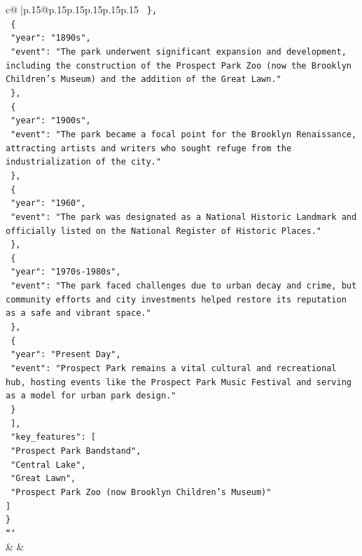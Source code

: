 \documentclass{article}
\begin{document}
{\begin{supertabular}{c@{$\;$}|p{.15\linewidth}@{}p{.15\linewidth}p{.15\linewidth}p{.15\linewidth}p{.15\linewidth}p{.15\linewidth}}
{{{\texttt{    \},} \\
\texttt{    \{} \\
\texttt{      "year": "1890s",} \\
\texttt{      "event": "The park underwent significant expansion and development, including the construction of the Prospect Park Zoo (now the Brooklyn Children's Museum) and the addition of the Great Lawn."} \\
\texttt{    \},} \\
\texttt{    \{} \\
\texttt{      "year": "1900s",} \\
\texttt{      "event": "The park became a focal point for the Brooklyn Renaissance, attracting artists and writers who sought refuge from the industrialization of the city."} \\
\texttt{    \},} \\
\texttt{    \{} \\
\texttt{      "year": "1960",} \\
\texttt{      "event": "The park was designated as a National Historic Landmark and officially listed on the National Register of Historic Places."} \\
\texttt{    \},} \\
\texttt{    \{} \\
\texttt{      "year": "1970s{-}1980s",} \\
\texttt{      "event": "The park faced challenges due to urban decay and crime, but community efforts and city investments helped restore its reputation as a safe and vibrant space."} \\
\texttt{    \},} \\
\texttt{    \{} \\
\texttt{      "year": "Present Day",} \\
\texttt{      "event": "Prospect Park remains a vital cultural and recreational hub, hosting events like the Prospect Park Music Festival and serving as a model for urban park design."} \\
\texttt{    \}} \\
\texttt{  {]},} \\
\texttt{  "key\_features": {[}} \\
\texttt{    "Prospect Park Bandstand",} \\
\texttt{    "Central Lake",} \\
\texttt{    "Great Lawn",} \\
\texttt{    "Prospect Park Zoo (now Brooklyn Children's Museum)"} \\
\texttt{  {]}} \\
\texttt{\}} \\
\texttt{```} \\
            }
        }
    }
    & & \\ \\


\end{supertabular}}
\end{document}
